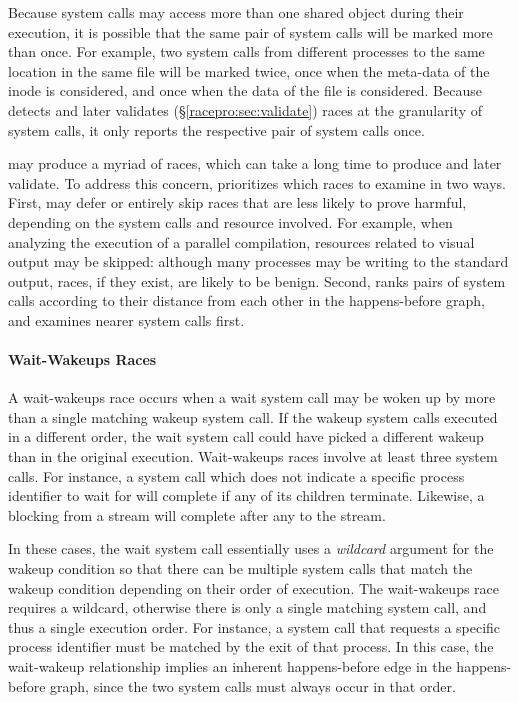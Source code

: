 Because system calls may access more than one shared object
during their execution, it is possible that the same pair of system
calls will be marked more than once. For example, two  system
calls from different processes to the same location in the same file
will be marked twice, once when the meta-data of the inode is
considered, and once when the data of the file is considered. Because
\racepro detects and later validates (\S\ref{racepro:sec:validate}) races at the
granularity of system calls, it only reports the respective pair of
system calls once.

\racepro may produce a myriad of races, which can take a long time to
produce and later validate.  To address this concern, \racepro prioritizes 
which races to examine in two ways. First, \racepro may defer or entirely skip
races that are less likely to prove harmful, depending on the system
calls and resource involved. For example,  when analyzing the execution
of a parallel compilation, resources related to visual output may be
skipped: although many processes may be writing to the standard
output, races, if they exist, are likely to be benign.  Second, \racepro
ranks pairs of system calls according to their distance from each
other in the happens-before graph, and examines nearer system calls
first. 

\paragraph{Wait-Wakeups Races} \label{racepro:sec:wait-wakeup}

A wait-wakeups race occurs when a wait system call may be woken up
by more than a single matching wakeup system call. 
If the wakeup system calls executed in a different order, the
wait system call could have picked a different wakeup than in the
original execution.  Wait-wakeups races involve at least three system
calls.  For instance, a  system call which does not indicate a
specific process identifier to wait for will complete if any of its
children terminate.  Likewise, a blocking  from a stream will
complete after any  to the stream. 

In these cases, the wait system call essentially uses a 
\emph{wildcard} argument for the wakeup condition so that there can be
multiple system calls that match the wakeup condition depending on
their order of execution.  The wait-wakeups race requires a wildcard,
otherwise there is only a single matching system call, and thus a
single execution order.  For instance, a  system call that
requests a specific process identifier must be matched by the exit of
that process. In this case, the wait-wakeup relationship implies an
inherent happens-before edge in the happens-before graph, since the
two system calls must always occur in that order.

